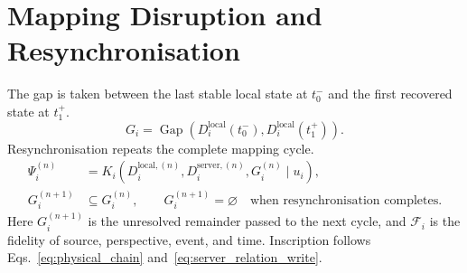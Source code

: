 \section{Mapping Disruption and Resynchronisation}
\label{app:mapping_disruption}

The gap is taken between the last stable local state at $t_0^-$ and the first
recovered state at $t_1^+$.
\begin{equation}
  G_i=\operatorname{Gap}\!\left(
    D_i^{\mathrm{local}}(t_0^-),D_i^{\mathrm{local}}(t_1^+)
  \right).
  \label{eq:mapping_gap}
\end{equation}
Resynchronisation repeats the complete mapping cycle.
\begin{align}
  \Psi_i^{(n)}
    &=K_i\!\left(
        D_i^{\mathrm{local},(n)},D_i^{\mathrm{server},(n)},G_i^{(n)}
        \mid u_i
      \right),
      \label{eq:resynchronisation_map}\\
  G_i^{(n+1)}&\subseteq G_i^{(n)},
  \qquad
  G_i^{(n+1)}=\varnothing
  \quad\text{when resynchronisation completes}.
  \label{eq:residual_mapping_gap}
\end{align}
\noindent Here $G_i^{(n+1)}$ is the unresolved remainder passed to the next cycle,
and $\mathcal F_i$ is the fidelity of source, perspective, event, and time.
Inscription follows Eqs.~\eqref{eq:physical_chain}
and~\eqref{eq:server_relation_write}.
